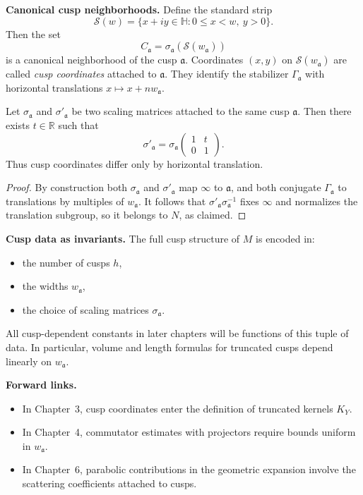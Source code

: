 \medskip
\noindent
\textbf{Canonical cusp neighborhoods.}
Define the standard strip
\[
  \mathcal{S}(w) = \{ x+iy \in \mathbb{H} : 0 \le x < w, \ y > 0 \}.
\]
Then the set
\[
  C_{\mathfrak{a}} = \sigma_{\mathfrak{a}}(\mathcal{S}(w_{\mathfrak{a}}))
\]
is a canonical neighborhood of the cusp $\mathfrak{a}$. 
Coordinates $(x,y)$ on $\mathcal{S}(w_{\mathfrak{a}})$
are called \emph{cusp coordinates} attached to $\mathfrak{a}$.
They identify the stabilizer $\Gamma_{\mathfrak{a}}$
with horizontal translations $x \mapsto x+n w_{\mathfrak{a}}$.

\begin{lemma}
Let $\sigma_{\mathfrak{a}}$ and $\sigma'_{\mathfrak{a}}$
be two scaling matrices attached to the same cusp $\mathfrak{a}$.
Then there exists $t \in \mathbb{R}$ such that
\[
  \sigma'_{\mathfrak{a}} = \sigma_{\mathfrak{a}}
  \begin{pmatrix} 1 & t \\ 0 & 1 \end{pmatrix}.
\]
Thus cusp coordinates differ only by horizontal translation.
\end{lemma}

\begin{proof}
By construction both $\sigma_{\mathfrak{a}}$ and $\sigma'_{\mathfrak{a}}$
map $\infty$ to $\mathfrak{a}$,
and both conjugate $\Gamma_{\mathfrak{a}}$ to translations by multiples
of $w_{\mathfrak{a}}$. 
It follows that $\sigma'_{\mathfrak{a}} \sigma_{\mathfrak{a}}^{-1}$
fixes $\infty$ and normalizes the translation subgroup,
so it belongs to $N$, as claimed.
\end{proof}

\medskip
\noindent
\textbf{Cusp data as invariants.}
The full cusp structure of $M$ is encoded in:
\begin{itemize}
  \item the number of cusps $h$,
  \item the widths $w_{\mathfrak{a}}$,
  \item the choice of scaling matrices $\sigma_{\mathfrak{a}}$.
\end{itemize}
All cusp-dependent constants in later chapters will be functions
of this tuple of data. 
In particular, volume and length formulas
for truncated cusps depend linearly on $w_{\mathfrak{a}}$.

\medskip
\noindent
\textbf{Forward links.}
\begin{itemize}
  \item In Chapter~3, cusp coordinates enter the definition
        of truncated kernels $K_{Y}$.
  \item In Chapter~4, commutator estimates with projectors
        require bounds uniform in $w_{\mathfrak{a}}$.
  \item In Chapter~6, parabolic contributions in the geometric expansion
        involve the scattering coefficients attached to cusps.
\end{itemize}

